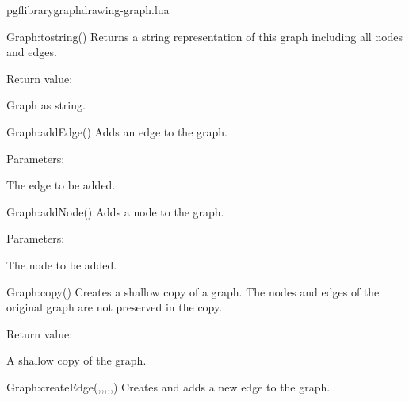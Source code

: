 
\begin{filedescription}{pgflibrarygraphdrawing-graph.lua}


\begin{luacommand}{{Graph:\textunderscore{}\textunderscore{}tostring}()}
Returns a string representation of this graph including all nodes and edges. 


Return value:
\begin{parameterdescription} 
  \item[] Graph as string. 
\end{parameterdescription}


\end{luacommand}
\begin{luacommand}{{Graph:addEdge}()}
Adds an edge to the graph. 

Parameters:
\begin{parameterdescription}
	\item[\meta{edge}] The edge to be added. 
\end{parameterdescription}



\end{luacommand}
\begin{luacommand}{{Graph:addNode}()}
Adds a node to the graph. 

Parameters:
\begin{parameterdescription}
	\item[\meta{node}] The node to be added. 
\end{parameterdescription}



\end{luacommand}
\begin{luacommand}{{Graph:copy}()}
Creates a shallow copy of a graph.  The nodes and edges of the original graph are not preserved in the copy. 


Return value:
\begin{parameterdescription} 
  \item[] A shallow copy of the graph. 
\end{parameterdescription}


\end{luacommand}
\begin{luacommand}{{Graph:createEdge}(,,,,,)}
Creates and adds a new edge to the graph. 


\end{luacommand}
\end{filedescription}
